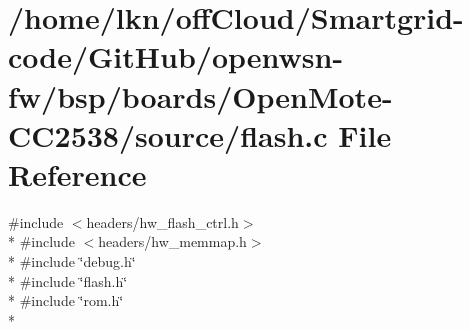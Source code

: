 \hypertarget{_open_mote-_c_c2538_2source_2flash_8c}{}\section{/home/lkn/off\+Cloud/\+Smartgrid-\/code/\+Git\+Hub/openwsn-\/fw/bsp/boards/\+Open\+Mote-\/\+C\+C2538/source/flash.c File Reference}
\label{_open_mote-_c_c2538_2source_2flash_8c}
{\ttfamily \#include $<$headers/hw\+\_\+flash\+\_\+ctrl.\+h$>$}\\*
{\ttfamily \#include $<$headers/hw\+\_\+memmap.\+h$>$}\\*
{\ttfamily \#include \char`\"{}debug.\+h\char`\"{}}\\*
{\ttfamily \#include \char`\"{}flash.\+h\char`\"{}}\\*
{\ttfamily \#include \char`\"{}rom.\+h\char`\"{}}\\*
